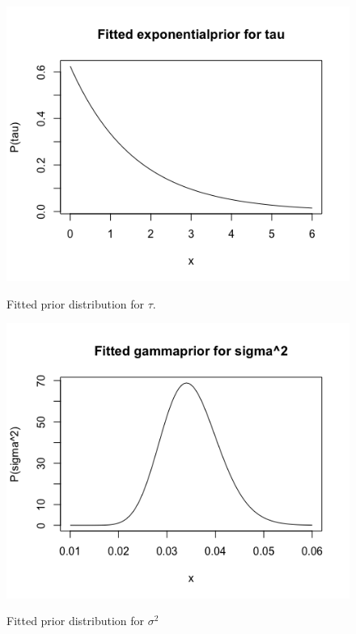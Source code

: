 \begin{figure}[!htb]
\hspace{-40pt}
   \begin{minipage}{0.475\textwidth}
     \centering
     \includegraphics[width=1.3\linewidth]{figurer/fitted_exponential.png}
     \label{fig:data_original}
     \caption{Fitted prior distribution for $\tau$.}
   \end{minipage}\hfill
   \hspace{-40pt}
   \begin{minipage}{0.475\textwidth}
     \centering
     \includegraphics[width=1.3\linewidth]{figurer/fitted_gamma.png}
	 \label{fig:data_original_reduced}
	 \caption{Fitted prior distribution for $\sigma^2$}
	 \end{minipage}
\end{figure}
	
